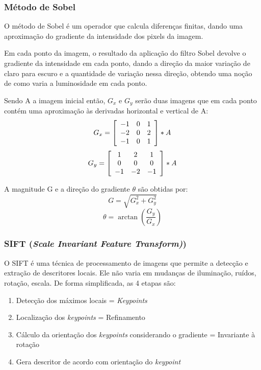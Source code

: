 \documentclass{article}
\begin{document}
\subsubsection{Método de Sobel}
O método de Sobel é um operador que calcula diferenças finitas, dando uma aproximação do gradiente da intensidade dos pixels da imagem. 
\par Em cada ponto da imagem, o resultado da aplicação do filtro Sobel devolve o gradiente da intensidade em cada ponto, dando a direção da maior variação de claro para escuro e a quantidade de variação nessa direção, obtendo uma noção de como varia a luminosidade em cada ponto.
\par Sendo A a imagem inicial então, $G_{x}$ e $G_{y}$ serão duas imagens que em cada ponto contém uma aproximação às derivadas horizontal e vertical de A:
$$G_{x}= \left[
    \begin{array}{c c c}
    -1 & 0 & 1\\
    -2 & 0 & 2\\
    -1 & 0 & 1\\
    \end{array}\right]* A$$
$$G_{y}= \left[
    \begin{array}{c c c}
     1 & 2 & 1\\
     0 & 0 & 0\\
    -1 & -2 & -1\\
    \end{array}\right]*A$$

A  magnitude G e a direção do gradiente $\theta$ são obtidas por:
$$G=\sqrt{G_{x}^2+G_{y}^2}$$
$$\theta=\arctan(\frac{G_{y}}{G_{x}})$$

\subsubsection{SIFT (\textit{Scale Invariant Feature Transform)})}
O SIFT é uma técnica de processamento de imagens que permite a detecção e extração de descritores locais. Ele não varia em mudanças de iluminação, ruídos, rotação, escala.
De forma simplificada, as 4 etapas são:
\begin{enumerate}
    \item Detecção dos máximos locais = \textit{Keypoints}
    \item Localização dos \textit{keypoints} = Refinamento
    \item Cálculo da orientação dos \textit{keypoints} considerando o gradiente = Invariante à rotação
    \item Gera descritor de acordo com orientação do \textit{keypoint}
\end{enumerate}
\end{document}
